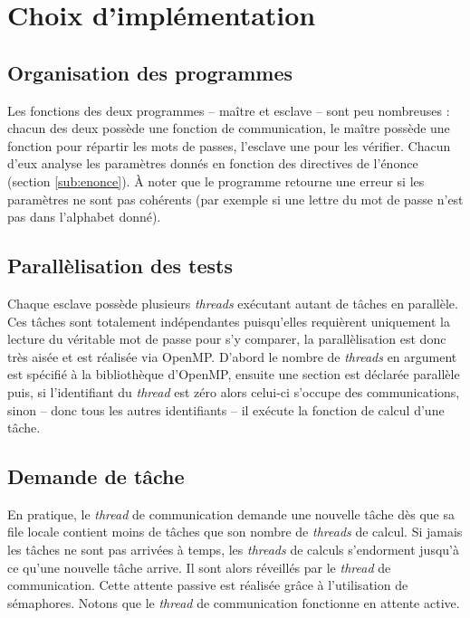 \section{Choix d'implémentation} %
\label{sec:impl}

\subsection{Organisation des programmes} %

Les fonctions des deux programmes -- maître et esclave -- sont peu nombreuses : chacun des deux possède une fonction de communication, le maître possède une fonction pour répartir les mots de passes, l'esclave une pour les vérifier. Chacun d'eux analyse les paramètres donnés en fonction des directives de l'énonce (section \ref{sub:enonce}). \`A noter que le programme retourne une erreur si les paramètres ne sont pas cohérents (par exemple si une lettre du mot de passe n'est pas dans l'alphabet donné).

\subsection{Parallèlisation des tests}

Chaque esclave possède plusieurs \emph{threads} exécutant autant de tâches en parallèle. Ces tâches sont totalement indépendantes puisqu'elles requièrent uniquement la lecture du véritable mot de passe pour s'y comparer, la parallèlisation est donc très aisée et est réalisée via \textsf{OpenMP}. D'abord le nombre de \emph{threads} en argument est spécifié à la bibliothèque d'\textsf{OpenMP}, ensuite une section est déclarée parallèle puis, si l'identifiant du \emph{thread} est zéro alors celui-ci s'occupe des communications, sinon -- donc tous les autres identifiants -- il exécute la fonction de calcul d'une tâche.


\subsection{Demande de tâche} %

En pratique, le \emph{thread} de communication demande une nouvelle tâche dès que sa file locale contient moins de tâches que son nombre de \emph{threads} de calcul. Si jamais les tâches ne sont pas arrivées à temps, les \emph{threads} de calculs s'endorment jusqu'à ce qu'une nouvelle tâche arrive. Il sont alors réveillés par le \emph{thread} de communication. Cette attente passive est réalisée grâce à l'utilisation de sémaphores. Notons que le \emph{thread} de communication fonctionne en attente active.

